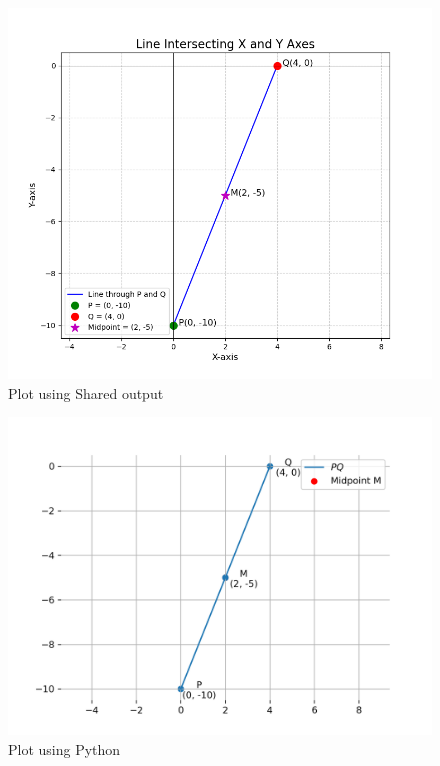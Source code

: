 \documentclass[journal]{IEEEtran}
\begin{document}
\begin{figure}[h!]
    \centering
    \includegraphics[width=0.6\columnwidth]{figs/Figure_1.png}
    \caption{Plot using Shared output}
\end{figure}

\begin{figure}[h!]
    \centering
    \includegraphics[width=0.6\columnwidth]{figs/fig.png}
    \caption{Plot using Python}
\end{figure}
\end{document}
